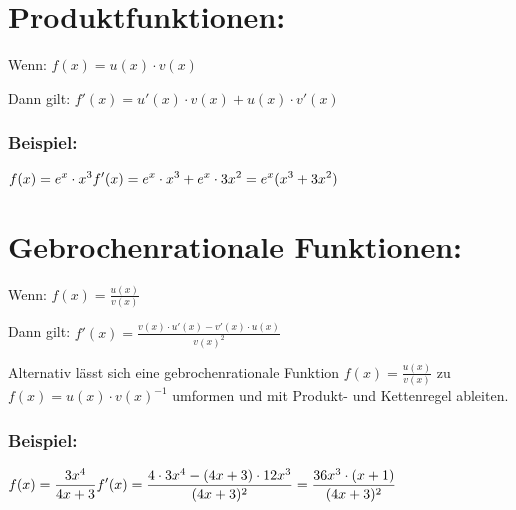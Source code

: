 \documentclass{article}
\begin{document}
    \section*{Produktfunktionen:}
    Wenn: \break
    \begin{math}
            {\displaystyle f(x) = u(x) \cdot v(x)}
    \end{math}

    Dann gilt:\break
        \begin{math}
            {\displaystyle f'(x) = u'(x) \cdot v(x) + u(x) \cdot v'(x)}
        \end{math}

    \subsubsection*{Beispiel:}
    \begin{math}
        {\displaystyle f(x) = e^x \cdot x^3} \break\break
        {\displaystyle f'(x) = e^x \cdot x^3 + e^x \cdot 3x^2 = e^x(x^3+3x^2)}
    \end{math}

    \section*{Gebrochenrationale Funktionen:}
    Wenn: \break
    \begin{math}
            {\displaystyle f(x) = \frac{u(x)}{v(x)}}
    \end{math}
    
    Dann gilt: \break
    \begin{math}
        {\displaystyle f'(x) = \frac{v(x)\cdot u'(x) - v'(x) \cdot u(x)}{v(x)^2}}
    \end{math}

    Alternativ lässt sich eine gebrochenrationale Funktion \begin{math}
        {\displaystyle f(x) = \frac{u(x)}{v(x)}}
    \end{math} zu \begin{math}
        {\displaystyle f(x) = u(x) \cdot v(x)^{-1} }
    \end{math}
    umformen und mit Produkt- und Kettenregel ableiten.
    \subsubsection*{Beispiel:}
    \begin{math}
        {\displaystyle f(x) = \frac{3x^4}{4x+3}}\break\break
        {\displaystyle f'(x) = \frac{4\cdot 3x^4 - (4x+3) \cdot 12x^3}{(4x+3)^2} = \frac{36x^3\cdot (x+1)}{(4x+3)^2}}
    \end{math}
\end{document}
